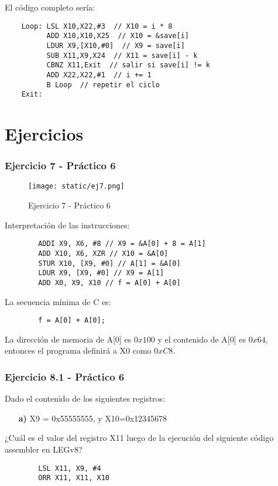\documentclass[aspectradio=43]{beamer}
\begin{document}
\begin{frame}[containsverbatim]
    El código completo sería:
    \begin{verbatim}
    Loop: LSL X10,X22,#3  // X10 = i * 8
          ADD X10,X10,X25  // X10 = &save[i]
          LDUR X9,[X10,#0]  // X9 = save[i]
          SUB X11,X9,X24  // X11 = save[i] - k
          CBNZ X11,Exit  // salir si save[i] != k
          ADD X22,X22,#1  // i += 1
          B Loop  // repetir el ciclo
    Exit:
    \end{verbatim}
\end{frame}

\section{Ejercicios}
\begin{frame}
    \frametitle{Ejercicio 7 - Práctico 6}
    \begin{figure}
        \centering
        \texttt{[image: static/ej7.png]}
        \caption{Ejercicio 7 - Práctico 6}
    \end{figure}
\end{frame}

\begin{frame}[containsverbatim]
    Interpretación de las instrucciones:
    \begin{verbatim}
        ADDI X9, X6, #8 // X9 = &A[0] + 8 = A[1]
        ADD X10, X6, XZR // X10 = &A[0]
        STUR X10, [X9, #0] // A[1] = &A[0]
        LDUR X9, [X9, #0] // X9 = A[1]
        ADD X0, X9, X10 // f = A[0] + A[0]
    \end{verbatim}
    La secuencia mínima de C es:
    \begin{verbatim}
        f = A[0] + A[0];
    \end{verbatim}
    La dirección de memoria de A[0] es \(0x100\) y el contenido de A[0] es \(0x64\), entonces el programa definirá a X0 como \(0xC8\).
\end{frame}

\begin{frame}[containsverbatim]
    \frametitle{Ejercicio 8.1 - Práctico 6}
    Dado el contenido de los siguientes registros:
    \begin{itemize}
        \item[\textbf{a)}] X9 = 0x55555555, y X10=0x12345678
    \end{itemize}
    ¿Cuál es el valor del registro X11 luego de la ejecución del siguiente código
    assembler en LEGv8?
    \begin{verbatim}
        LSL X11, X9, #4
        ORR X11, X11, X10
    \end{verbatim}
\end{frame}
\end{document}
